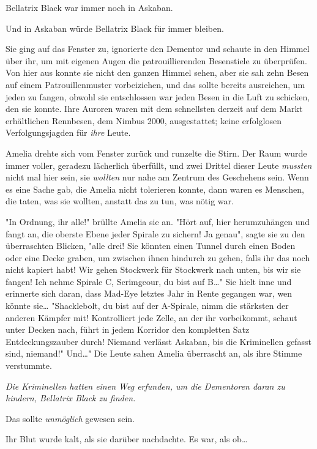 {Bellatrix Black war immer noch in Askaban.

Und in Askaban würde Bellatrix Black für immer bleiben.

Sie ging auf das Fenster zu, ignorierte den Dementor und schaute in den Himmel über ihr, um mit eigenen Augen die patrouillierenden Besenstiele zu überprüfen. Von hier aus konnte sie nicht den ganzen Himmel sehen, aber sie sah zehn Besen auf einem Patrouillenmuster vorbeiziehen, und das sollte bereits ausreichen, um jeden zu fangen, obwohl sie entschlossen war jeden Besen in die Luft zu schicken, den sie konnte. Ihre Auroren waren mit dem schnellsten derzeit auf dem Markt erhältlichen Rennbesen, dem Nimbus 2000, ausgestattet; keine erfolglosen Verfolgungsjagden für \emph{ihre} Leute.

Amelia drehte sich vom Fenster zurück und runzelte die Stirn. Der Raum wurde immer voller, geradezu lächerlich überfüllt, und zwei Drittel dieser Leute \emph{mussten} nicht mal hier sein, sie \emph{wollten} nur nahe am Zentrum des Geschehens sein. Wenn es eine Sache gab, die Amelia nicht tolerieren konnte, dann waren es Menschen, die taten, was sie wollten, anstatt das zu tun, was nötig war.

"In Ordnung, ihr alle!" brüllte Amelia sie an. "Hört auf, hier herumzuhängen und fangt an, die oberste Ebene jeder Spirale zu sichern! Ja genau", sagte sie zu den überraschten Blicken, "alle drei! Sie könnten einen Tunnel durch einen Boden oder eine Decke graben, um zwischen ihnen hindurch zu gehen, falls ihr das noch nicht kapiert habt! Wir gehen Stockwerk für Stockwerk nach unten, bis wir sie fangen! Ich nehme Spirale C, Scrimgeour, du bist auf B…" Sie hielt inne und erinnerte sich daran, dass Mad-Eye letztes Jahr in Rente gegangen war, wen könnte sie… "Shacklebolt, du bist auf der A-Spirale, nimm die stärksten der anderen Kämpfer mit! Kontrolliert jede Zelle, an der ihr vorbeikommt, schaut unter Decken nach, führt in jedem Korridor den kompletten Satz Entdeckungszauber durch! Niemand verlässt Askaban, bis die Kriminellen gefasst sind, niemand!" Und…" Die Leute sahen Amelia überrascht an, als ihre Stimme verstummte.

\emph{Die Kriminellen hatten einen Weg erfunden, um die Dementoren daran zu hindern, Bellatrix Black zu finden.}

Das sollte \emph{unmöglich} gewesen sein.

Ihr Blut wurde kalt, als sie darüber nachdachte. Es war, als ob…

}
